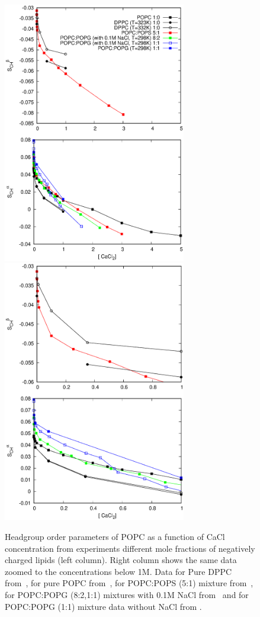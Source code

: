 \documentclass[journal=jpcbfk]{achemso}
\begin{document}
\begin{figure}[]
  \centering
  \includegraphics[width=8.0cm]{../Figs/LIPIDSwithCaCl.eps}
  \includegraphics[width=8.0cm]{../Figs/LIPIDSwithCaClBELOW1M.eps}
  \caption{\label{OrderParametersWithCaCl}
    Headgroup order parameters of POPC as a function of CaCl concentration from experiments 
    different mole fractions of negatively charged lipids (left column).
    Right column shows the same data zoomed to the concentrations below 1M.
    Data for Pure DPPC from~\cite{akutsu81},
    for pure POPC from~\cite{altenbach84}, 
    for POPC:POPS (5:1) mixture from~\cite{roux90},
    for POPC:POPG (8:2,1:1) mixtures with 0.1M NaCl from~\cite{macdonald87}
    and for POPC:POPG (1:1) mixture data without NaCl from \cite{borle85}.
  }
\end{figure}
\end{document}
